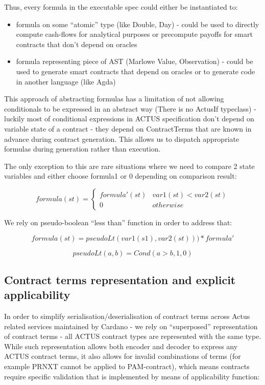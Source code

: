 \documentclass[runningheads]{llncs}
\begin{document}
Thus, every formula in the executable spec could either be instantiated
to: 
\begin{itemize}
\item formula on some ``atomic'' type (like Double, Day) - could be used
to directly compute cash-flows for analytical purposes or precompute
payoffs for smart contracts that don't depend on oracles 
\item formula representing piece of AST (Marlowe Value, Observation) - could
be used to generate smart contracts that depend on oracles or to generate
code in another language (like Agda) 
\end{itemize}
This approach of abstracting formulas has a limitation of not allowing
conditionals to be expressed in an abstract way (There is no ActusIf
typeclass) - luckily most of conditional expressions in ACTUS specification
don't depend on variable state of a contract - they depend on ContractTerms
that are known in advance during contract generation. This allows
us to dispatch appropriate formulas during generation rather than
execution.

The only exception to this are rare situations where we need to compare
2 state variables and either choose formula1 or 0 depending on comparison
result:

\begin{equation}
formula(st)=\begin{cases}
formula'(st) & var1(st)<var2(st)\\
0 & otherwise
\end{cases}
\end{equation}

We rely on pseudo-boolean ``less than'' function in order to address
that:

\noindent 
\begin{equation}
formula(st)=pseudoLt(var1(s1),var2(st)))*formula'
\end{equation}

\noindent 
\begin{equation}
pseudoLt(a,b)=Cond(a>b,1,0)
\end{equation}


\subsection{Contract terms representation and explicit applicability}

In order to simplify serialisation/deserialisation of contract terms
across Actus related services maintained by Cardano - we rely on ``superposed''
representation of contract terms - all ACTUS contract types are represented
with the same type. While such representation allows both encoder
and decoder to express any ACTUS contract terms, it also allows for
invalid combinations of terms (for example PRNXT cannot be applied
to PAM-contract), which means contracts require specific validation
that is implemented by means of applicability function:
\end{document}
